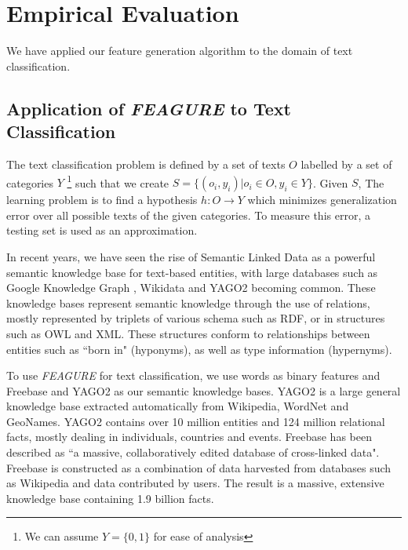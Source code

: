 \documentclass[twoside,11pt]{article}
\theoremstyle{definition}
\begin{document}
\section{Empirical Evaluation}
We have applied our feature generation algorithm to the domain of text classification. %

\subsection{Application of \emph{FEAGURE} to Text Classification} \label{text-feagure}

The text classification problem is defined by a set of texts $O$ labelled by a set of categories $Y$ \footnote{We can assume $Y=\{0,1\}$ for ease of analysis}
such that we create $S=\{(o_i,y_i)|o_i\in O, y_i\in Y\}$. Given $S$, The learning problem is to find a hypothesis $h:O\rightarrow Y$ which minimizes generalization error over all possible texts of the given categories. To measure this error, a testing set is used as an approximation.

In recent years, we have seen the rise of Semantic Linked Data as a powerful semantic knowledge base for text-based entities, with large databases such as Google Knowledge Graph \cite{pelikanova2014google}, Wikidata \cite{vrandevcic2014wikidata} and YAGO2  becoming common. 
These knowledge bases represent semantic knowledge through the use of relations, mostly represented by triplets of various schema such as RDF, or in structures such as OWL and XML. These structures conform to relationships between entities such as ``born in" (hyponyms), as well as type information (hypernyms).

To use \emph{FEAGURE} for text classification, we use words as binary features and Freebase and YAGO2 as our semantic knowledge bases.
YAGO2 \cite{hoffart2013yago2} is a large general knowledge base extracted automatically from Wikipedia, WordNet and GeoNames.
YAGO2 contains over 10 million entities and 124 million relational facts, mostly dealing in individuals, countries and events.
Freebase \cite{bollacker2008freebase} has been described as ``a massive, collaboratively edited database of cross-linked data". Freebase is constructed as a combination of data harvested from databases such as Wikipedia and data contributed by users. The result is a massive, extensive knowledge base containing 1.9 billion facts. 
\end{document}
